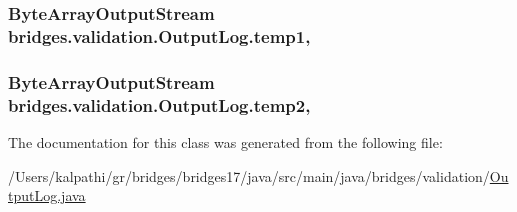 \subsubsection[{temp1}]{\setlength{\rightskip}{0pt plus 5cm}Byte\+Array\+Output\+Stream bridges.\+validation.\+Output\+Log.\+temp1\hspace{0.3cm}{\ttfamily [static]}, {\ttfamily [protected]}}\label{classbridges_1_1validation_1_1_output_log_a142611812dd1ea095c4a1274bd40a93a}
\hypertarget{classbridges_1_1validation_1_1_output_log_ab1f0ab7e9ada60f29c4c4f59694c1163}{}
\subsubsection[{temp2}]{\setlength{\rightskip}{0pt plus 5cm}Byte\+Array\+Output\+Stream bridges.\+validation.\+Output\+Log.\+temp2\hspace{0.3cm}{\ttfamily [static]}, {\ttfamily [protected]}}\label{classbridges_1_1validation_1_1_output_log_ab1f0ab7e9ada60f29c4c4f59694c1163}


The documentation for this class was generated from the following file\+:\begin{DoxyCompactItemize}
\item 
/\+Users/kalpathi/gr/bridges/bridges17/java/src/main/java/bridges/validation/\hyperlink{_output_log_8java}{Output\+Log.\+java}\end{DoxyCompactItemize}

